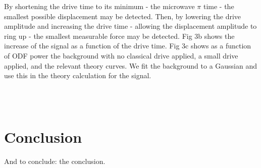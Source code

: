 \documentclass[aps,prl,twocolumn,groupedaddress]{revtex4-1}
\begin{document}
By shortening the drive time to its minimum - the microwave $\pi$ time - the smallest possible displacement may be detected. Then, by lowering the drive amplitude and increasing the drive time - allowing the displacement amplitude to ring up - the smallest measurable force may be detected. Fig 3b shows the increase of the signal as a function of the drive time. Fig 3c shows as a function of ODF power the background with no classical drive applied, a small drive applied, and the relevant theory curves. We fit the background to a Gaussian and use this in the theory calculation for the signal.
\begin{figure}
\centering
  \\
  \hfill
  \hfill
  \\    
  \caption{}\label{fig:3}
\end{figure}

\section{Conclusion}
And to conclude: the conclusion.

\subsection{}
\subsubsection{}





\nocite{}
\end{document}
